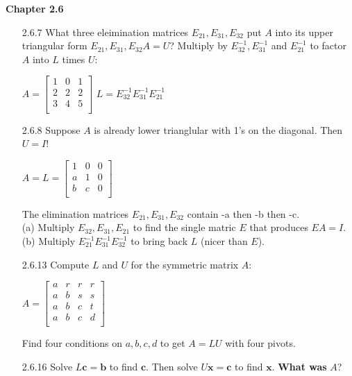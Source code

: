 \documentclass[10pt,twoside,reqno]{article}
\begin{document}
\textbf{Chapter 2.6}
\begin{enumerate}
\item[2.6.7] What three eleimination matrices $E_{21}, E_{31}, E_{32}$ put $A$ into its upper triangular form $E_{21}, E_{31}, E_{32}A = U$? Multiply by $E_{32}^{-1}, E_{31}^{-1}$ and  $E_{21}^{-1}$ to factor $A$ into $L$ times $U$:\\
\begin{center}
$
$$
A=
\begin{bmatrix}
1&0&1\\
2&2&2\\
3&4&5\\
\end{bmatrix}
$$
$
$L = E_{32}^{-1} E_{31}^{-1} E_{21}^{-1}$\\
\end{center}
\item[2.6.8] Suppose $A$ is already lower trianglular with 1's on the diagonal. Then $U = I$!\\
\begin{center}
$
$$
A= L=
\begin{bmatrix}
1&0&0\\
a&1&0\\
b&c&0\\
\end{bmatrix}
$$
$
\end{center}
The elimination matrices $E_{21}, E_{31}, E_{32}$ contain -a then -b then -c.\\
(a) Multiply $E_{32}, E_{31}, E_{21}$ to find the single matric $E$ that produces $EA = I$.\\
(b) Multiply $E_{21}^{-1} E_{31}^{-1} E_{32}^{-1}$ to bring back $L$ (nicer than $E$).\\
\item[2.6.13] Compute $L$ and $U$ for the symmetric matrix $A$:\\
\begin{center}
$
$$
A=
\begin{bmatrix}
a&r&r&r\\
a&b&s&s\\
a&b&c&t\\
a&b&c&d\\
\end{bmatrix}
$$
$
\end{center}
Find four conditions on $a, b, c, d$ to get $A = LU$ with four pivots.\\
\item[2.6.16] Solve $L\pmb{c} = \pmb{b}$ to find $\pmb{c}$. Then solve $U\pmb{x} = \pmb{c}$ to find $\pmb{x}$. \textbf{What was} $A$?\\

\end{enumerate}
\end{document}
